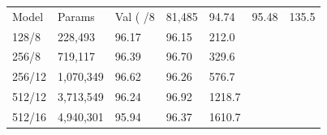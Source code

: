 \begin{tabular}{lllll}
\toprule
Model & Params & Val (%
/8 & 81,485 & 94.74 & 95.48 & 135.5 \\
128/8 & 228,493 & 96.17 & 96.15 & 212.0 \\
256/8 & 719,117 & 96.39 & 96.70 & 329.6 \\
256/12 & 1,070,349 & 96.62 & 96.26 & 576.7 \\
512/12 & 3,713,549 & 96.24 & 96.92 & 1218.7 \\
512/16 & 4,940,301 & 95.94 & 96.37 & 1610.7 \\
\bottomrule
\end{tabular}
